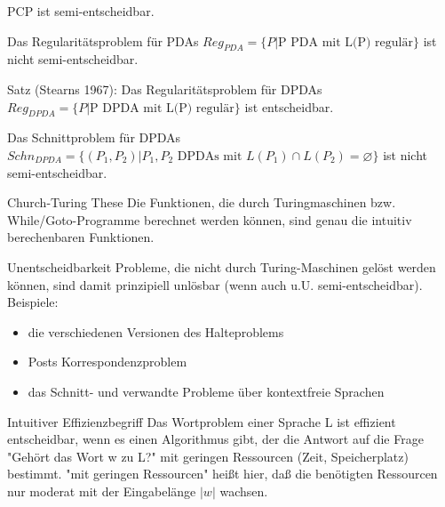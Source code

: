\documentclass[avery5371]{flashcards}
\begin{document}
\begin{flashcard}[Satz]{} PCP ist semi-entscheidbar.
\end{flashcard}

\begin{flashcard}[Satz]{} Das Regularitätsproblem für PDAs $Reg_{PDA} = \{P | \text{P PDA mit L(P) regulär}\}$ ist nicht semi-entscheidbar.
\end{flashcard}

\begin{flashcard}[Satz]{} Satz  (Stearns 1967): Das Regularitätsproblem für DPDAs $Reg_{DPDA} = \{ P | \text{P DPDA mit L(P) regulär}\}$ ist entscheidbar.
\end{flashcard}

\begin{flashcard}[Satz]{} Das Schnittproblem für DPDAs $Schn_{DPDA} = \{(P_1, P_2 ) | P_1, P_2 \text{ DPDAs mit } L(P_1)\cap L(P_2) = \varnothing\}$ ist nicht semi-entscheidbar.
\end{flashcard}

    \begin{flashcard}[Definition]{ Church-Turing These} Die Funktionen, die durch Turingmaschinen bzw. While/Goto-Programme berechnet werden können, sind genau die intuitiv berechenbaren Funktionen.
    \end{flashcard}

        \begin{flashcard}[Definition]{Unentscheidbarkeit} Probleme, die nicht durch Turing-Maschinen gelöst werden können, sind damit prinzipiell unlösbar (wenn auch u.U. semi-entscheidbar). Beispiele:\begin{itemize}
\item die verschiedenen Versionen des Halteproblems
\item Posts Korrespondenzproblem
\item das Schnitt- und verwandte Probleme über kontextfreie Sprachen
\end{itemize}
\end{flashcard}

\begin{flashcard}[Definition]{Intuitiver Effizienzbegriff} 
Das Wortproblem einer Sprache L ist effizient entscheidbar, wenn es einen Algorithmus gibt, der die Antwort auf die Frage "Gehört das Wort w zu L?" mit geringen Ressourcen (Zeit, Speicherplatz) bestimmt. "mit geringen Ressourcen" heißt hier, daß die benötigten Ressourcen nur moderat mit der Eingabelänge $|w|$ wachsen.
\end{flashcard}
\end{document}
